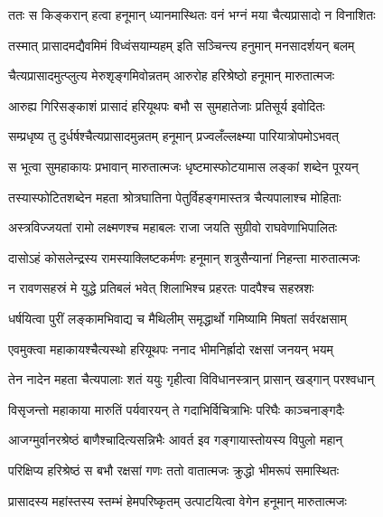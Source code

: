 
\twolineshloka
{ततः स किङ्करान् हत्वा हनूमान् ध्यानमास्थितः}
{वनं भग्नं मया चैत्यप्रासादो न विनाशितः} %

\twolineshloka
{तस्मात् प्रासादमद्यैवमिमं विध्वंसयाम्यहम्}
{इति सञ्चिन्त्य हनुमान् मनसादर्शयन् बलम्} %

\twolineshloka
{चैत्यप्रासादमुत्प्लुत्य मेरुशृङ्गमिवोन्नतम्}
{आरुरोह हरिश्रेष्ठो हनूमान् मारुतात्मजः} %

\twolineshloka
{आरुह्य गिरिसङ्काशं प्रासादं हरियूथपः}
{बभौ स सुमहातेजाः प्रतिसूर्य इवोदितः} %

\twolineshloka
{सम्प्रधृष्य तु दुर्धर्षश्चैत्यप्रासादमुन्नतम्}
{हनूमान् प्रज्वलँल्लक्ष्म्या पारियात्रोपमोऽभवत्} %

\twolineshloka
{स भूत्वा सुमहाकायः प्रभावान् मारुतात्मजः}
{धृष्टमास्फोटयामास लङ्कां शब्देन पूरयन्} %

\twolineshloka
{तस्यास्फोटितशब्देन महता श्रोत्रघातिना}
{पेतुर्विहङ्गमास्तत्र चैत्यपालाश्च मोहिताः} %

\twolineshloka
{अस्त्रविज्जयतां रामो लक्ष्मणश्च महाबलः}
{राजा जयति सुग्रीवो राघवेणाभिपालितः} %

\twolineshloka
{दासोऽहं कोसलेन्द्रस्य रामस्याक्लिष्टकर्मणः}
{हनूमान् शत्रुसैन्यानां निहन्ता मारुतात्मजः} %

\twolineshloka
{न रावणसहस्रं मे युद्धे प्रतिबलं भवेत्}
{शिलाभिश्च प्रहरतः पादपैश्च सहस्रशः} %

\twolineshloka
{धर्षयित्वा पुरीं लङ्कामभिवाद्य च मैथिलीम्}
{समृद्धार्थो गमिष्यामि मिषतां सर्वरक्षसाम्} %

\twolineshloka
{एवमुक्त्वा महाकायश्चैत्यस्थो हरियूथपः}
{ननाद भीमनिर्ह्रादो रक्षसां जनयन् भयम्} %

\twolineshloka
{तेन नादेन महता चैत्यपालाः शतं ययुः}
{गृहीत्वा विविधानस्त्रान् प्रासान् खड्गान् परश्वधान्} %

\twolineshloka
{विसृजन्तो महाकाया मारुतिं पर्यवारयन्}
{ते गदाभिर्विचित्राभिः परिघैः काञ्चनाङ्गदैः} %

\twolineshloka
{आजग्मुर्वानरश्रेष्ठं बाणैश्चादित्यसन्निभैः}
{आवर्त इव गङ्गायास्तोयस्य विपुलो महान्} %

\twolineshloka
{परिक्षिप्य हरिश्रेष्ठं स बभौ रक्षसां गणः}
{ततो वातात्मजः क्रुद्धो भीमरूपं समास्थितः} %

\twolineshloka
{प्रासादस्य महांस्तस्य स्तम्भं हेमपरिष्कृतम्}
{उत्पाटयित्वा वेगेन हनूमान् मारुतात्मजः} %

